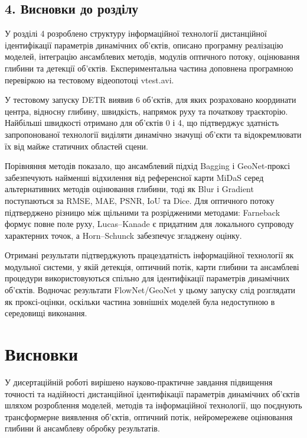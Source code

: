 \documentclass[
]{article}
\begin{document}
\subsection{4. Висновки до розділу}\label{ux432ux438ux441ux43dux43eux432ux43aux438-ux434ux43e-ux440ux43eux437ux434ux456ux43bux443-3}

У розділі 4 розроблено структуру інформаційної технології дистанційної ідентифікації параметрів динамічних об'єктів, описано програмну реалізацію моделей, інтеграцію ансамблевих методів, модулів оптичного потоку, оцінювання глибини та детекції об'єктів. Експериментальна частина доповнена програмною перевіркою на тестовому відеопотоці vtest.avi.

У тестовому запуску DETR виявив 6 об'єктів, для яких розраховано координати центра, відносну глибину, швидкість, напрямок руху та початкову траєкторію. Найбільші швидкості отримано для об'єктів 0 і 4, що підтверджує здатність запропонованої технології виділяти динамічно значущі об'єкти та відокремлювати їх від майже статичних областей сцени.

Порівняння методів показало, що ансамблевий підхід Bagging і GeoNet-проксі забезпечують найменші відхилення від референсної карти MiDaS серед альтернативних методів оцінювання глибини, тоді як Blur і Gradient поступаються за RMSE, MAE, PSNR, IoU та Dice. Для оптичного потоку підтверджено різницю між щільними та розрідженими методами: Farneback формує повне поле руху, Lucas--Kanade є придатним для локального супроводу характерних точок, а Horn--Schunck забезпечує згладжену оцінку.

Отримані результати підтверджують працездатність інформаційної технології як модульної системи, у якій детекція, оптичний потік, карти глибини та ансамблеві процедури використовуються спільно для ідентифікації параметрів динамічних об'єктів. Водночас результати FlowNet/GeoNet у цьому запуску слід розглядати як проксі-оцінки, оскільки частина зовнішніх моделей була недоступною в середовищі виконання.

\section{Висновки}\label{ux432ux438ux441ux43dux43eux432ux43aux438}

У дисертаційній роботі вирішено науково-практичне завдання підвищення точності та надійності дистанційної ідентифікації параметрів динамічних об'єктів шляхом розроблення моделей, методів та інформаційної технології, що поєднують трансформерне виявлення об'єктів, оптичний потік, нейромережеве оцінювання глибини й ансамблеву обробку результатів.
\end{document}
